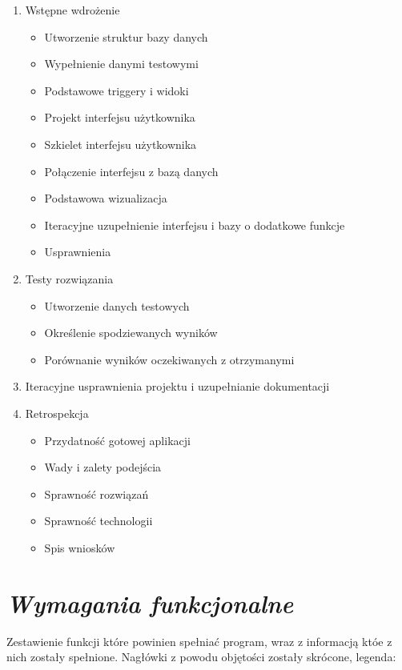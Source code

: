 \documentclass[a4paper,10pt]{report}
\newcommand{\customstylechapter}[1]{\large{\textit{#1}}}
\begin{document}
{\begin{enumerate}
\begin{itemize}
    \end{itemize}
    \item Wstępne wdrożenie
    \begin{itemize}
        \item Utworzenie struktur bazy danych
        \item Wypełnienie danymi testowymi
        \item Podstawowe triggery i widoki
        \item Projekt interfejsu użytkownika
        \item Szkielet interfejsu użytkownika
        \item Połączenie interfejsu z bazą danych
        \item Podstawowa wizualizacja
        \item Iteracyjne uzupełnienie interfejsu i bazy o dodatkowe funkcje
        \item Usprawnienia
    \end{itemize}
    \item Testy rozwiązania
    \begin{itemize}
        \item Utworzenie danych testowych
        \item Określenie spodziewanych wyników
        \item Porównanie wyników oczekiwanych z otrzymanymi 
    \end{itemize}
    \item Iteracyjne usprawnienia projektu i uzupełnianie dokumentacji
    \item Retrospekcja
    \begin{itemize}
        \item Przydatność gotowej aplikacji
        \item Wady i zalety podejścia
        \item Sprawność rozwiązań
        \item Sprawność technologii
        \item Spis wniosków
    \end{itemize}
\end{enumerate}
}

\chapter{\customstylechapter{Wymagania funkcjonalne}}
{Zestawienie funkcji które powinien spełniać program, wraz z informacją któe 
z nich zostały spełnione. Nagłówki z powodu objętości zostały skrócone, legenda:}
\end{document}
